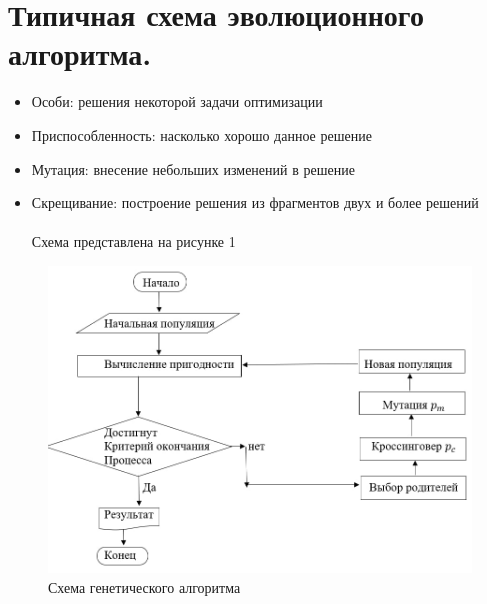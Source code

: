 \section{Типичная схема эволюционного алгоритма.}
\begin{itemize}
     Нужно решить задачу оптимизации. На каждом этапе особи проходят отбор (выживание). Если особи не улучшают показатели, то  нет смысла впускать их в новую популяцию.  \\
     \\
Упрощенная эволюция, выполняемая на компьютере:\\
\item Особи: решения некоторой задачи оптимизации \\
\item Приспособленность: насколько хорошо данное решение\\
\item Мутация: внесение небольших изменений в решение\\
\item Скрещивание: построение решения из фрагментов двух и более решений\\
\\
Схема представлена на рисунке 1
\end{itemize}
\begin{figure}[h]
\centering
\includegraphics[width=0.8\linewidth]{images/Sxema.jpg}
\caption{Схема генетического алгоритма}
\label{fig:mpr}
\end{figure}
